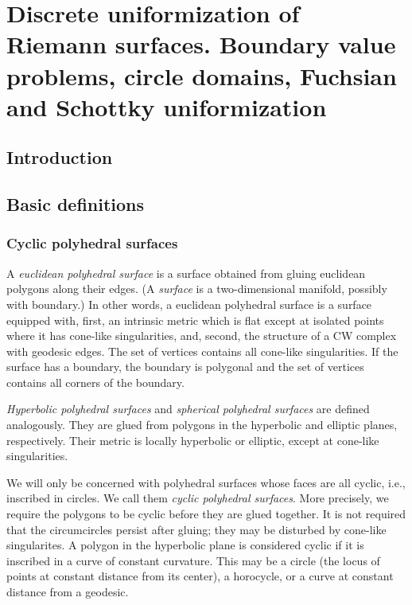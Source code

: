 \documentclass[Thesis.tex]{subfiles}
\begin{document}
\chapter{Discrete uniformization of Riemann surfaces. Boundary value problems, circle domains,
Fuchsian and Schottky uniformization}

  \section{Introduction}

  \section{Basic definitions}

  \subsection{Cyclic polyhedral surfaces }


  A \emph{euclidean polyhedral surface} is a surface obtained from
  gluing euclidean polygons along their edges. (A \emph{surface} is a
  two-dimensional manifold, possibly with boundary.)  In other words, a
  euclidean polyhedral surface is a surface equipped with, first, an
  intrinsic metric which is flat except at isolated points where it has
  cone-like singularities, and, second, the structure of a CW complex
  with geodesic edges. The set of vertices contains all cone-like
  singularities. If the surface has a boundary, the boundary is
  polygonal and the set of vertices contains all corners of the
  boundary.

  \emph{Hyperbolic polyhedral surfaces} and \emph{spherical polyhedral
    surfaces} are defined analogously. They are glued from polygons in
  the hyperbolic and elliptic planes, respectively. Their metric is
  locally hyperbolic or elliptic, except at cone-like singularities.

  We will only be concerned with polyhedral surfaces whose faces are all
  cyclic, i.e., inscribed in circles. We call them \emph{cyclic
    polyhedral surfaces}. More precisely, we require the polygons to be
  cyclic before they are glued together. It is not required that the
  circumcircles persist after gluing; they may be disturbed by cone-like
  singularites. A polygon in the hyperbolic plane is considered cyclic
  if it is inscribed in a curve of constant curvature. This may be a
  circle (the locus of points at constant distance from its center), a
  horocycle, or a curve at constant distance from a geodesic.
\end{document}
